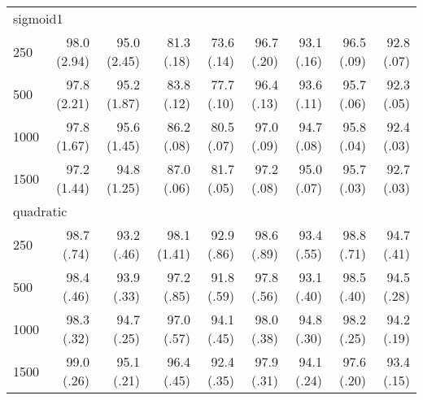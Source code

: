 \begin{tabular}{lrrrrrrrr}
 \multicolumn{9}{l}{sigmoid1} \\ 
250 & 98.0 (2.94) & 95.0 (2.45) & 81.3 (.18) & 73.6 (.14) & 96.7 (.20) & 93.1 (.16) & 96.5 (.09) & 92.8 (.07) \\ 
  500 & 97.8 (2.21) & 95.2 (1.87) & 83.8 (.12) & 77.7 (.10) & 96.4 (.13) & 93.6 (.11) & 95.7 (.06) & 92.3 (.05) \\ 
  1000 & 97.8 (1.67) & 95.6 (1.45) & 86.2 (.08) & 80.5 (.07) & 97.0 (.09) & 94.7 (.08) & 95.8 (.04) & 92.4 (.03) \\ 
  1500 & 97.2 (1.44) & 94.8 (1.25) & 87.0 (.06) & 81.7 (.05) & 97.2 (.08) & 95.0 (.07) & 95.7 (.03) & 92.7 (.03) \\ 
          
 \multicolumn{9}{l}{quadratic} \\ 
250 & 98.7 (.74) & 93.2 (.46) & 98.1 (1.41) & 92.9 (.86) & 98.6 (.89) & 93.4 (.55) & 98.8 (.71) & 94.7 (.41) \\ 
  500 & 98.4 (.46) & 93.9 (.33) & 97.2 (.85) & 91.8 (.59) & 97.8 (.56) & 93.1 (.40) & 98.5 (.40) & 94.5 (.28) \\ 
  1000 & 98.3 (.32) & 94.7 (.25) & 97.0 (.57) & 94.1 (.45) & 98.0 (.38) & 94.8 (.30) & 98.2 (.25) & 94.2 (.19) \\ 
  1500 & 99.0 (.26) & 95.1 (.21) & 96.4 (.45) & 92.4 (.35) & 97.9 (.31) & 94.1 (.24) & 97.6 (.20) & 93.4 (.15) \\ 
   \hline
\end{tabular}
